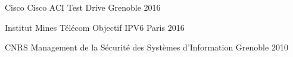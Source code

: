 \begin{cventries}

  \cventrynodescr
    {Cisco} %
    {Cisco ACI Test Drive} %
    {Grenoble} %
    {2016} %
    {}

  \cventrynodescr
    {Institut Mines Télécom} %
    {Objectif IPV6} %
    {Paris} %
    {2016} %
    {}

  \cventrynodescr
    {CNRS} %
    {Management de la Sécurité des Systèmes d'Information} %
    {Grenoble} %
    {2010} %
    {}

\end{cventries}
